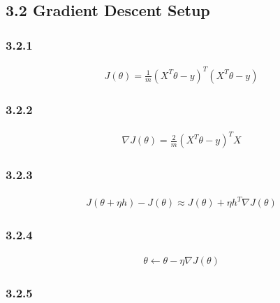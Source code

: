 \documentclass[11pt]{article}
\begin{document}
    \subsection{3.2 Gradient Descent Setup}\label{gradient-descent-setup}

    \subsubsection{3.2.1}\label{section}

    \begin{align}
J(\theta) = \frac{1}{m}(X^T\theta - y)^T(X^T\theta - y)
\end{align}

    \subsubsection{3.2.2}\label{section}

    \begin{align}
\nabla J(\theta) = \frac{2}{m}(X^T\theta - y)^TX
\end{align}

    \subsubsection{3.2.3}\label{section}

    \begin{align}
J(\theta + \eta h) - J(\theta) \approx J(\theta) + \eta h^T \nabla J(\theta)
\end{align}

    \subsubsection{3.2.4}\label{section}

    \begin{align}
\theta \leftarrow \theta - \eta \nabla J(\theta)
\end{align}

    \subsubsection{3.2.5}\label{section}
\end{document}
